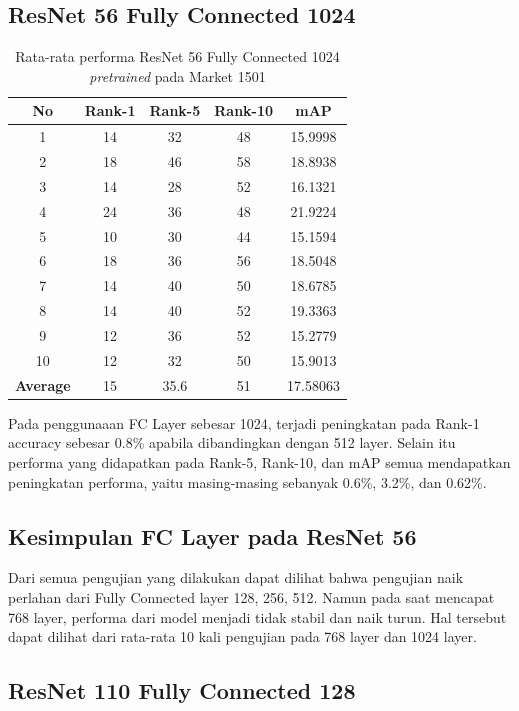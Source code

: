 \subsection{ResNet 56 Fully Connected 1024}
\vspace{2ex}
\begin{longtable}{|c|c|c|c|c|}
	\caption{Rata-rata performa ResNet 56 Fully Connected 1024 \textit{pretrained} pada Market 1501 }
	\label{tabel: 13}\\
	\hline
	\rowcolor[HTML]{C0C0C0}
	\textbf{No} &\textbf{Rank-1} & \textbf{Rank-5} & \textbf{Rank-10} & \textbf{mAP} \\
	\hline
	1 &14 &32 &48 &15.9998 \\
	2 &18 &46 &58 &18.8938 \\
	3 &14 &28 &52 &16.1321 \\
	4 &24 &36 &48 &21.9224 \\
	5 &10 &30 &44 &15.1594 \\
	6 &18 &36 &56 &18.5048 \\
	7 &14 &40 &50 &18.6785 \\
	8 &14 &40 &52 &19.3363 \\
	9 &12 &36 &52 &15.2779 \\
	10 &12 &32 &50 &15.9013 \\
	\hline
	\textbf{Average} & 15 & 35.6 & 51 &17.58063 \\
	\hline
\end{longtable}
\vspace{2ex}
Pada penggunaaan FC Layer sebesar 1024, terjadi peningkatan pada Rank-1 accuracy sebesar 0.8\% apabila dibandingkan dengan 512 layer. Selain itu performa yang didapatkan pada Rank-5, Rank-10, dan mAP semua mendapatkan peningkatan performa, yaitu masing-masing sebanyak 0.6\%, 3.2\%, dan 0.62\%.

\subsection{Kesimpulan FC Layer pada ResNet 56}
Dari semua pengujian yang dilakukan dapat dilihat bahwa pengujian naik perlahan dari Fully Connected layer 128, 256, 512. Namun pada saat mencapat 768 layer, performa dari model menjadi tidak stabil dan naik turun. Hal tersebut dapat dilihat dari rata-rata 10 kali pengujian pada 768 layer dan 1024 layer.

\subsection{ResNet 110 Fully Connected 128}

